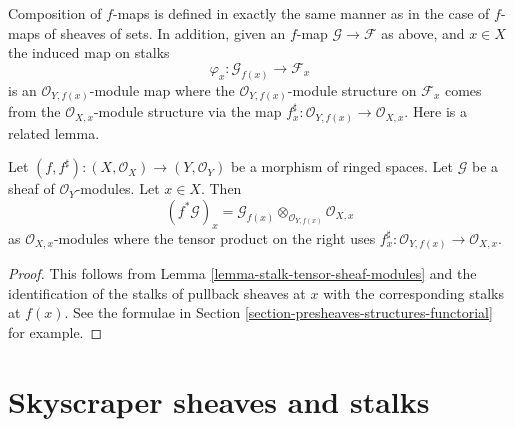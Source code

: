 \medskip\noindent
Composition of $f$-maps is defined in exactly the
same manner as in the case of $f$-maps of sheaves of
sets. In addition, given an $f$-map $\mathcal{G} \to \mathcal{F}$
as above, and $x \in X$ the induced map on stalks
$$
\varphi_x : \mathcal{G}_{f(x)} \longrightarrow \mathcal{F}_x
$$
is an $\mathcal{O}_{Y, f(x)}$-module map where the
$\mathcal{O}_{Y, f(x)}$-module structure on $\mathcal{F}_x$
comes from the $\mathcal{O}_{X, x}$-module structure via
the map $f^\sharp_x : \mathcal{O}_{Y, f(x)} \to \mathcal{O}_{X, x}$.
Here is a related lemma.

\begin{lemma}
\label{lemma-stalk-pullback-modules}
Let $(f, f^\sharp) : (X, \mathcal{O}_X) \to (Y, \mathcal{O}_Y)$
be a morphism of ringed spaces.
Let $\mathcal{G}$ be a sheaf of $\mathcal{O}_Y$-modules.
Let $x \in X$. Then
$$
(f^*\mathcal{G})_x =
\mathcal{G}_{f(x)}
\otimes_{\mathcal{O}_{Y, f(x)}}
\mathcal{O}_{X, x}
$$
as $\mathcal{O}_{X, x}$-modules where the tensor product on the right
uses $f^\sharp_x : \mathcal{O}_{Y, f(x)} \to \mathcal{O}_{X, x}$.
\end{lemma}

\begin{proof}
This follows from Lemma \ref{lemma-stalk-tensor-sheaf-modules}
and the identification of the stalks of pullback sheaves
at $x$ with the corresponding stalks at $f(x)$. See the
formulae in Section \ref{section-presheaves-structures-functorial}
for example.
\end{proof}



\section{Skyscraper sheaves and stalks}
\label{section-skyscraper-sheaves}

